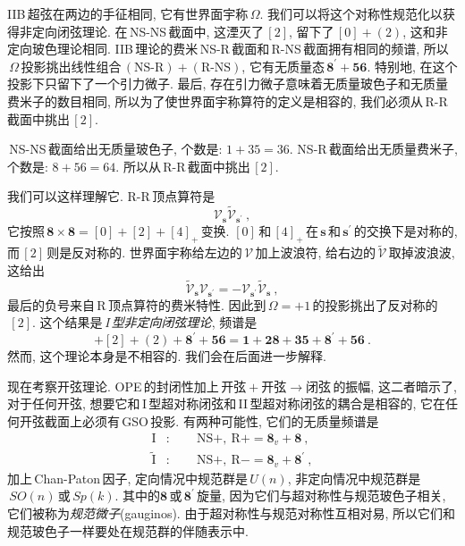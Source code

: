 IIB\,超弦在两边的手征相同, 它有世界面宇称\,$\Omega$. 我们可以将这个对称性规范化以获得非定向闭弦理论. 在\,NS-NS\,截面中, 这湮灭了\,$[2]$, 留下了$\,[0]+(2)$, 这和非定向玻色理论相同. IIB\,理论的费米\,NS-R\,截面和\,R-NS\,截面拥有相同的频谱, 所以$\,\Omega\,$投影挑出线性组合$\,(\text{NS-R})+(\text{R-NS})$, 它有无质量态$\,\mathbf{8}^{\prime}+\mathbf{56}$. 特别地, 在这个投影下只留下了一个引力微子. 最后, 存在引力微子意味着无质量玻色子和无质量费米子的数目相同, 所以为了使世界面宇称算符的定义是相容的, 我们必须从\,R-R\,截面中挑出\,$[2]$. 
\begin{tcolorbox}
\,NS-NS\,截面给出无质量玻色子, 个数是: $1+35=36$. NS-R\,截面给出无质量费米子, 个数是: $8+56=64$. 所以从\,R-R\,截面中挑出$\,[2]$.
\end{tcolorbox}
\noindent 我们可以这样理解它. R-R\,顶点算符是
\begin{equation}
    \mathscr{V}_{\mathbf{s}}\tilde{\mathscr{V}}_{\mathbf{s}^{\prime}} \:, \label{10.6.16}
\end{equation}
它按照$\,\mathbf{8}\times\mathbf{8}=[0]+[2]+[4]_{+}\,$变换. $[0]\,$和$\,[4]_{+}\,$在$\,\mathbf{s}\,$和$\,\mathbf{s}^{\prime}\,$的交换下是对称的, 而$\,[2]\,$则是反对称的. 世界面宇称给左边的$\,\mathscr{V}\,$加上波浪符, 给右边的$\,\tilde{\mathscr{V}}\,$取掉波浪波, 这给出
\begin{equation}
    \tilde{\mathscr{V}}_{\mathbf{s}}\mathscr{V}_{\mathbf{s}^{\prime}}
    =-\mathscr{V}_{\mathbf{s}^{\prime}}\tilde{\mathscr{V}}_{\mathbf{s}}\:, \label{10.6.17}
\end{equation}
最后的负号来自\,R\,顶点算符的费米特性. 因此到$\,\Omega=+1\,$的投影挑出了反对称的$\,[2]$. 这个结果是\,\emph{I}\,{\emph{型非定向闭弦理论}}, 频谱是
\begin{equation}
    [0]+[2]+(2)+\mathbf{8}^{\prime}+\mathbf{56} = \mathbf{1}+\mathbf{28}+\mathbf{35}+\mathbf{8}^{\prime}+\mathbf{56}\:.\label{10.6.18}
\end{equation}
然而, 这个理论本身是不相容的. 我们会在后面进一步解释.

现在考察开弦理论. OPE\,的封闭性加上\,$\text{开弦}+\text{开弦}\to\text{闭弦}\,$的振幅, 这二者暗示了, 对于任何开弦, 想要它和\,I\,型超对称闭弦和\,II\,型超对称闭弦的耦合是相容的, 它在任何开弦截面上必须有\,GSO\,投影. 有两种可能性, 它们的无质量频谱是
\begin{align*}
    \text{I}&:\qquad \text{NS}+,\:\text{R}+ = \mathbf{8}_{v} +\mathbf{8} \: , \\
    \tilde{\text{I}}&:\qquad \text{NS}+,\:\text{R}- = \mathbf{8}_{v} +\mathbf{8}^{\prime} \: ,
\end{align*}
加上\,Chan-Paton\,因子, 定向情况中规范群是$\,U(n)$, 非定向情况中规范群是$\,SO(n)\,$或$\,Sp(k)$. 其中的$\mathbf{8}\,$或$\,\mathbf{8}^{\prime}\,$旋量, 因为它们与超对称性与规范玻色子相关, 它们被称为{\emph{规范微子}}(gauginos). 由于超对称性与规范对称性互相对易, 所以它们和规范玻色子一样要处在规范群的伴随表示中. 

